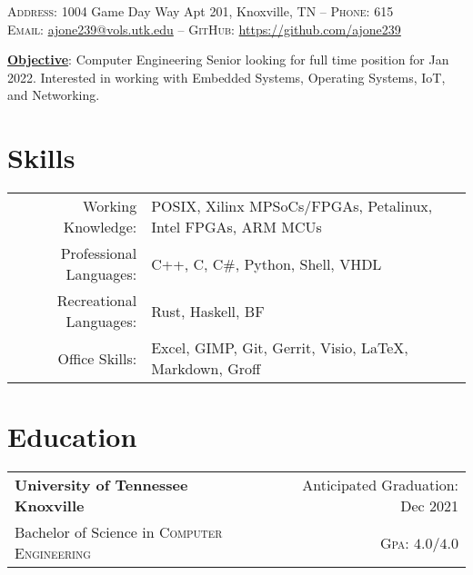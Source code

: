 \documentclass[a4paper,11pt]{article}
\begin{document}

\pagestyle{empty} %


\par{\smallskip{}
\par{\small \textsc{Address:} 1004 Game Day Way Apt 201, Knoxville, TN \---
\small \textsc{Phone:} 615\\
\textsc{Email:} \href{mailto:ajone239@vols.utk.edu}{ajone239@vols.utk.edu} \---
\textsc{GitHub:} \href{https://github.com/ajone239}{https://github.com/ajone239}
} \smallskip{}
\par{\textbf{\underline{Objective}}: Computer Engineering Senior looking for full time position for Jan 2022.
Interested in working with Embedded Systems, Operating Systems, IoT, and Networking.
}\smallskip}{}



\section{Skills}
\begin{tabularx}{\textwidth}{rl}
   Working Knowledge: & POSIX, Xilinx MPSoCs/FPGAs, Petalinux, Intel FPGAs, ARM MCUs\\
   Professional Languages: & C++, C, C\#, Python, Shell, VHDL\\
   Recreational Languages: & Rust, Haskell, BF\\
   Office Skills: & Excel, GIMP, Git, Gerrit, Visio, \LaTeX{}, Markdown, Groff\\
\end{tabularx}

\section{Education}
\begin{tabularx}{\textwidth}{lXr}
   \textbf{University of Tennessee Knoxville} & & Anticipated Graduation: Dec 2021\\
   Bachelor of Science in \textsc{Computer Engineering} &  & \normalsize \textsc{Gpa}: $4.0/4.0$\\
\end{tabularx}
\end{document}
